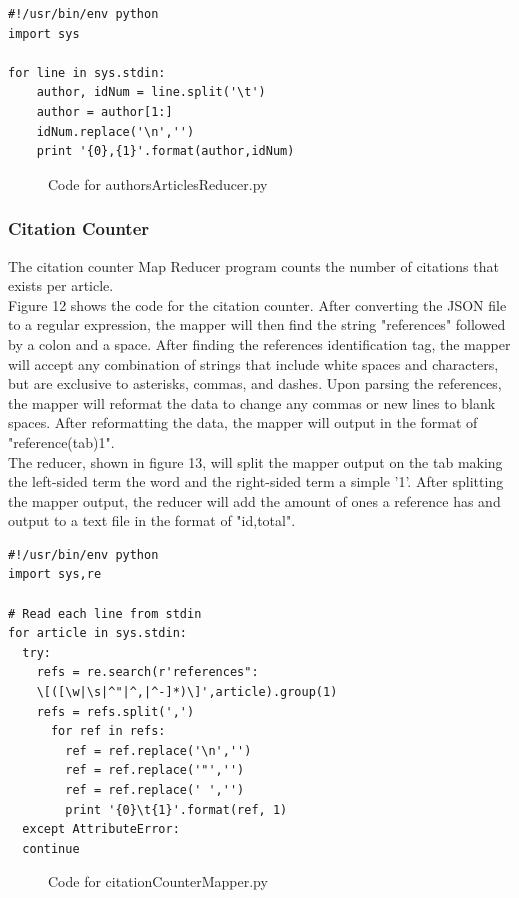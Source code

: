 \documentclass[10pt,journal,compsoc]{IEEEtran}
\begin{document}
\begin{verbatim}
#!/usr/bin/env python
import sys

for line in sys.stdin:
    author, idNum = line.split('\t')
    author = author[1:]
    idNum.replace('\n','')
    print '{0},{1}'.format(author,idNum)

\end{verbatim}
\begin{figure}[htp]
\centering
\caption{Code for authorsArticlesReducer.py}
\label{fig: authorsArticlesReducer.py}
\end{figure}

\subsubsection{Citation Counter}
The citation counter Map Reducer program counts the number of citations that exists per article.\\
\indent Figure 12 shows the code for the citation counter. After converting the JSON file to a regular expression, the mapper will then find the string "references" followed by a colon and a space. After finding the references identification tag, the mapper will accept any combination of strings that include white spaces and characters, but are exclusive to asterisks, commas, and dashes. Upon parsing the references, the mapper will reformat the data to change any commas or new lines to blank spaces. After reformatting the data, the mapper will output in the format of "reference(tab)1".\\
\indent The reducer, shown in figure 13, will split the mapper output on the tab making the left-sided term the word and the right-sided term a simple '1'. After splitting the mapper output, the reducer will add the amount of ones a reference has and output to a text file in the format of "id,total".
\begin{verbatim}
#!/usr/bin/env python
import sys,re

# Read each line from stdin
for article in sys.stdin:
  try:
    refs = re.search(r'references":
    \[([\w|\s|^"|^,|^-]*)\]',article).group(1)
    refs = refs.split(',')
      for ref in refs:
        ref = ref.replace('\n','')
        ref = ref.replace('"','')
        ref = ref.replace(' ','')
        print '{0}\t{1}'.format(ref, 1)
  except AttributeError:
  continue
\end{verbatim}
\begin{figure}[htp]
\centering
\caption{Code for citationCounterMapper.py}
\label{fig:}
\end{figure}
\end{document}
